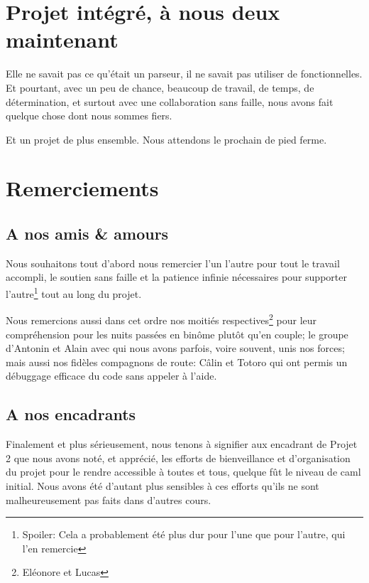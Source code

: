 \documentclass{article}
\begin{document}
\section{Projet intégré, à nous deux maintenant}
	
	Elle ne savait pas ce qu'était un parseur, il ne savait pas utiliser de fonctionnelles. Et pourtant, avec un peu de chance, beaucoup de travail, de temps, de détermination, et surtout avec une collaboration sans faille, nous avons fait quelque chose dont nous sommes fiers. 
	
	Et un projet de plus ensemble. Nous attendons le prochain de pied ferme.
	
\section{Remerciements}
\subsection{A nos amis \& amours}
Nous souhaitons tout d'abord nous remercier l'un l'autre pour tout le travail accompli, le soutien sans faille et la patience infinie nécessaires pour supporter l'autre\footnote{Spoiler: Cela a probablement été plus dur pour l'une que pour l'autre, qui l'en remercie} tout au long du projet. 

Nous remercions aussi dans cet ordre nos moitiés respectives\footnote{Eléonore et Lucas} pour leur compréhension pour les nuits passées en binôme plutôt qu'en couple; le groupe d'Antonin et Alain avec qui nous avons parfois, voire souvent, unis nos forces; mais aussi nos fidèles compagnons de route: Câlin et Totoro qui ont permis un débuggage efficace du code sans appeler à l'aide.
\subsection{A nos encadrants}
Finalement et plus sérieusement, nous tenons à signifier aux encadrant de Projet 2 que nous avons noté, et apprécié, les efforts de bienveillance et d'organisation du projet pour le rendre accessible à toutes et tous, quelque fût le niveau de caml initial. Nous avons été d'autant plus sensibles à ces efforts qu'ils ne sont malheureusement pas faits dans d'autres cours.




\end{document}
